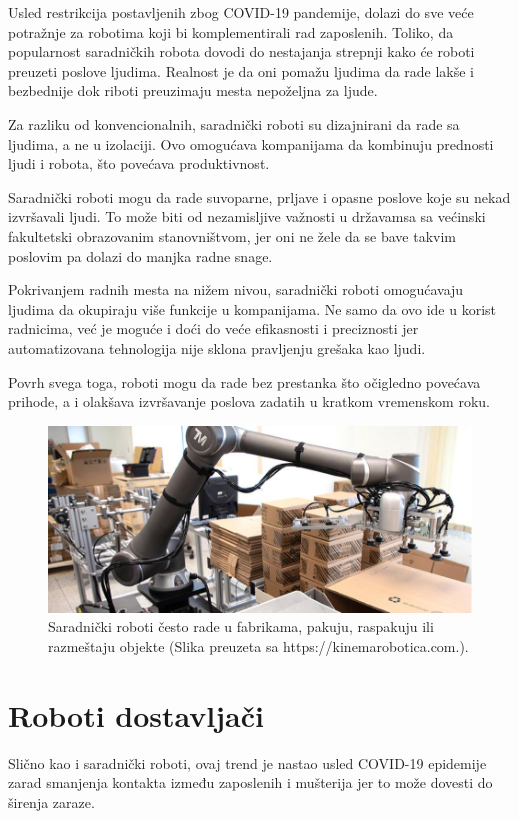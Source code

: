 \documentclass{report}
\begin{document}
Usled restrikcija postavljenih zbog COVID-19 pandemije, dolazi do sve veće potražnje za robotima koji bi komplementirali rad zaposlenih. Toliko, da popularnost saradničkih robota dovodi do nestajanja strepnji kako će roboti preuzeti poslove ljudima. Realnost je da oni pomažu ljudima da rade lakše i bezbednije dok riboti preuzimaju mesta nepoželjna za ljude.

Za razliku od konvencionalnih, saradnički roboti su dizajnirani da rade sa ljudima, a ne u izolaciji. Ovo omogućava kompanijama da kombinuju prednosti ljudi i robota, što povećava produktivnost. \cite{robotics2022}

Saradnički roboti mogu da rade suvoparne, prljave i opasne poslove koje su nekad izvršavali ljudi. To može biti od nezamisljive važnosti u državamsa sa većinski fakultetski obrazovanim stanovništvom, jer oni ne žele da se bave takvim poslovim pa dolazi do manjka radne snage.

Pokrivanjem radnih mesta na nižem nivou, saradnički roboti omogućavaju ljudima da okupiraju više funkcije u kompanijama. Ne samo da ovo ide u korist radnicima, već je moguće i doći do veće efikasnosti i preciznosti jer automatizovana tehnologija nije sklona pravljenju grešaka kao ljudi.

Povrh svega toga, roboti mogu da rade bez prestanka što očigledno povećava prihode, a i olakšava izvršavanje poslova zadatih u kratkom vremenskom roku. \cite{cobots}

\begin{figure}
\centering
\includegraphics[scale=0.41]{Cobot.jpg}
\caption{Saradnički roboti često rade u fabrikama, pakuju, raspakuju ili razmeštaju objekte (Slika preuzeta sa https://kinemarobotica.com.).}
\end{figure}

\chapter{Roboti dostavljači}
Slično kao i saradnički roboti, ovaj trend je nastao usled COVID-19 epidemije zarad smanjenja kontakta između zaposlenih i mušterija jer to može dovesti do širenja zaraze.
\end{document}
